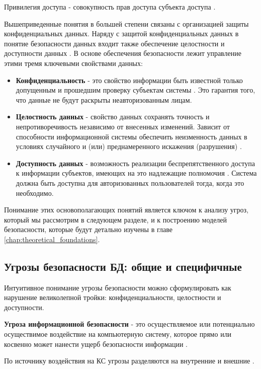 Привилегия доступа - совокупность прав доступа субъекта доступа \autocite[сс. 15-18]{Skakun}. 

Вышеприведенные понятия в большей степени связаны с организацией защиты конфиденциальных данных. Наряду с защитой конфиденциальных данных в понятие безопасности данных входит также обеспечение целостности и доступности данных \autocite[сс. 15-18]{Skakun}. В основе обеспечения безопасности лежит управление этими тремя ключевыми свойствами данных:
\begin{itemize}
    \item \textbf{Конфиденциальность} - это свойство информации быть известной только допущенным и прошедшим проверку субъектам системы \autocite[сс. 15-18]{Skakun}. Это гарантия того, что данные не будут раскрыты неавторизованным лицам.
    \item \textbf{Целостность данных} - свойство данных сохранять точность и непротиворечивость независимо от внесенных изменений. Зависит от способности информационной системы обеспечить неизменность данных в условиях случайного и (или) преднамеренного искажения (разрушения) \autocite[сс. 15-18]{Skakun}.
    \item \textbf{Доступность данных} - возможность реализации беспрепятственного доступа к информации субъектов, имеющих на это надлежащие полномочия \autocite[сс. 15-18]{Skakun}. Система должна быть доступна для авторизованных пользователей тогда, когда это необходимо.
\end{itemize}

Понимание этих основополагающих понятий является ключом к анализу угроз, который мы рассмотрим в следующем разделе, и к построению моделей безопасности, которые будут детально изучены в главе \ref{chap:theoretical_foundations}.

\subsection{Угрозы безопасности БД: общие и специфичные}
Интуитивное понимание угрозы безопасности можно сформулировать как нарушение великолепной тройки: конфиденциальности, целостности и доступности. 
\begin{grayquote}
\textbf{Угроза информационной безопасности} - это осуществляемое или потенциально осуществимое воздействие на компьютерную систему, которое прямо или косвенно может нанести ущерб безопасности информации \autocite[с. 19]{Skakun}.
\end{grayquote}
По источнику воздействия на КС угрозы разделяются на внутренние и внешние \autocite{Ytebov2008}.

